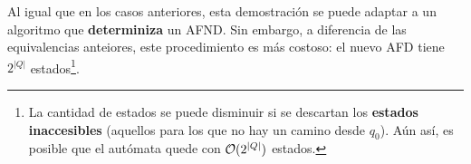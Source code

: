 Al igual que en los casos anteriores, esta demostración se puede adaptar a un algoritmo que \textbf{determiniza} un AFND. Sin embargo, a diferencia de las equivalencias anteiores, este procedimiento es más costoso: el nuevo AFD tiene $2^{|Q|}$ estados\footnote{La cantidad de estados se puede disminuir si se descartan los \textbf{estados inaccesibles} (aquellos para los que no hay un camino desde $q_0$). Aún así, es posible que el autómata quede con $\mathcal{O}(2^{|Q|})$ estados.}.
